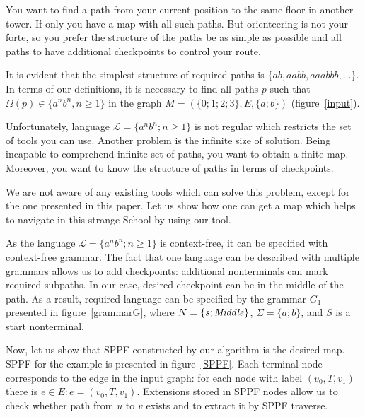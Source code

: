 You want to find a path from your current position to the same floor in another tower. 
If only you have a map with all such paths.
But orienteering is not your forte, so you prefer the structure of the paths be as simple as possible and all paths to have additional checkpoints to control your route.

It is evident that the simplest structure of required paths is $\{ab, aabb, aaabbb, \dots\}$.
In terms of our definitions, it is necessary to find all paths $p$ such that $\Omega(p) \in \{a^n b^n, n \geq 1\}$ in the graph $M=(\{0;1;2;3\},E,\{a;b\})$ (figure~\ref{input}).

Unfortunately, language $\mathcal{L} = \{a^n b^n; n \geq 1\}$ is not regular which restricts the set of tools you can use. 
Another problem is the infinite size of solution. Being incapable to comprehend infinite set of paths, you want to obtain a finite map.  
Moreover, you want to know the structure of paths in terms of checkpoints.

We are not aware of any existing tools which can solve this problem, except for the one presented in this paper.
Let us show how one can get a map which helps to navigate in this strange School by using our tool. 

As the language $\mathcal{L} = \{a^n b^n; n \geq 1\}$ is context-free, it can be specified with context-free grammar. 
The fact that one language can be described with multiple grammars allows us to add checkpoints: additional nonterminals can mark required subpaths.
In our case, desired checkpoint can be in the middle of the path.
As a result, required language can be specified by the grammar $G_1$ presented in figure~\ref{grammarG}, where $N = \{s; \text{\textit{Middle}}\}$, $\Sigma = \{a; b\}$, and $S$ is a start nonterminal.

Now, let us show that SPPF constructed by our algorithm is the desired map.
SPPF for the example is presented in figure~\ref{SPPF}.
Each terminal node corresponds to the edge in the input graph: for each node with label $(v_0, T, v_1)$ there is $e\in E: e=(v_0,T,v_1)$.
Extensions stored in SPPF nodes allow us to check whether path from $u$ to $v$ exists and to extract it by SPPF traverse. 

